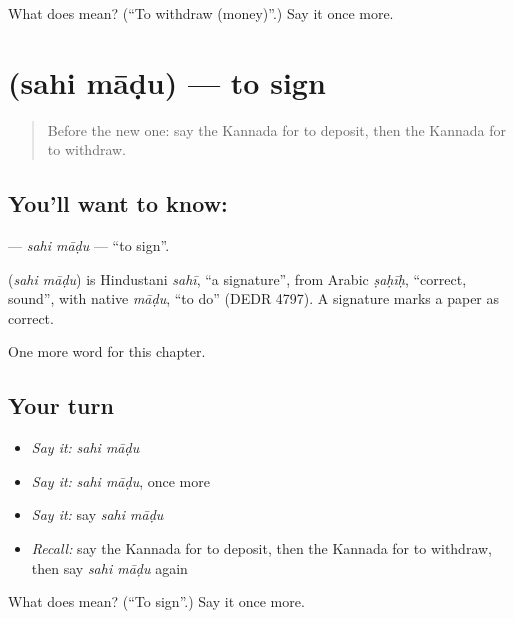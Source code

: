\begin{tcolorbox}[breakable,colback=teal!4,colframe=teal!35!black,title={Before you move on}]
What does  mean? (\textquotedblleft{}To withdraw (money)\textquotedblright{}.) Say it once more.
\end{tcolorbox}
\section[\texorpdfstring{\kn{ಸಹಿ} \kn{ಮಾಡು} (sahi māḍu)}{ಸಹಿ ಮಾಡು (sahi māḍu)}]{  (sahi māḍu) — to sign}

\label{lesson:KA-C274-sahi-madu}



\begin{quote}
Before the new one: say the Kannada for to deposit, then the Kannada for to withdraw.
\end{quote}

\subsection*{You'll want to know:  }
\textbf{ } — \emph{sahi māḍu} — \textquotedblleft{}to sign\textquotedblright{}.

\begin{cousinweb}
\textbf{ } (\emph{sahi māḍu}) is Hindustani \emph{sahī}, \textquotedblleft{}a signature\textquotedblright{}, from Arabic \emph{ṣaḥīḥ}, \textquotedblleft{}correct, sound\textquotedblright{}, with native \emph{māḍu}, \textquotedblleft{}to do\textquotedblright{} (DEDR 4797). A signature marks a paper as correct.
\end{cousinweb}

\begin{grammarlens}[title={What you've built}]
One more word for this chapter.
\end{grammarlens}

\subsection*{Your turn}
\begin{itemize}
\raggedright
  \item \emph{Say it:} \emph{sahi māḍu}
  \item \emph{Say it:} \emph{sahi māḍu}, once more
  \item \emph{Say it:} say \emph{sahi māḍu}
  \item \emph{Recall:} say the Kannada for to deposit, then the Kannada for to withdraw, then say \emph{sahi māḍu} again
\end{itemize}

\begin{tcolorbox}[breakable,colback=teal!4,colframe=teal!35!black,title={Before you move on}]
What does   mean? (\textquotedblleft{}To sign\textquotedblright{}.) Say it once more.
\end{tcolorbox}
